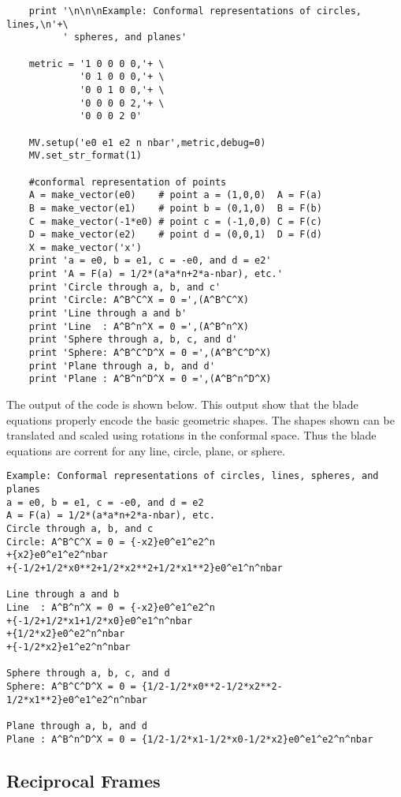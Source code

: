 \documentclass{article}
\begin{document}
\begin{verbatim}
    print '\n\n\nExample: Conformal representations of circles, lines,\n'+\
          ' spheres, and planes'

    metric = '1 0 0 0 0,'+ \
             '0 1 0 0 0,'+ \
             '0 0 1 0 0,'+ \
             '0 0 0 0 2,'+ \
             '0 0 0 2 0'

    MV.setup('e0 e1 e2 n nbar',metric,debug=0)
    MV.set_str_format(1)

    #conformal representation of points
    A = make_vector(e0)    # point a = (1,0,0)  A = F(a)
    B = make_vector(e1)    # point b = (0,1,0)  B = F(b)
    C = make_vector(-1*e0) # point c = (-1,0,0) C = F(c)
    D = make_vector(e2)    # point d = (0,0,1)  D = F(d)
    X = make_vector('x')
    print 'a = e0, b = e1, c = -e0, and d = e2'
    print 'A = F(a) = 1/2*(a*a*n+2*a-nbar), etc.'
    print 'Circle through a, b, and c'
    print 'Circle: A^B^C^X = 0 =',(A^B^C^X)
    print 'Line through a and b'
    print 'Line  : A^B^n^X = 0 =',(A^B^n^X)
    print 'Sphere through a, b, c, and d'
    print 'Sphere: A^B^C^D^X = 0 =',(A^B^C^D^X)
    print 'Plane through a, b, and d'
    print 'Plane : A^B^n^D^X = 0 =',(A^B^n^D^X)
\end{verbatim}

The output of the code is shown below.  This output show that the blade
equations properly encode the basic geometric shapes.  The shapes shown
can be translated and scaled using rotations in the conformal space. Thus
the blade equations are corrent for any line, circle, plane, or sphere. 

\begin{verbatim}
Example: Conformal representations of circles, lines, spheres, and planes
a = e0, b = e1, c = -e0, and d = e2
A = F(a) = 1/2*(a*a*n+2*a-nbar), etc.
Circle through a, b, and c
Circle: A^B^C^X = 0 = {-x2}e0^e1^e2^n
+{x2}e0^e1^e2^nbar
+{-1/2+1/2*x0**2+1/2*x2**2+1/2*x1**2}e0^e1^n^nbar

Line through a and b
Line  : A^B^n^X = 0 = {-x2}e0^e1^e2^n
+{-1/2+1/2*x1+1/2*x0}e0^e1^n^nbar
+{1/2*x2}e0^e2^n^nbar
+{-1/2*x2}e1^e2^n^nbar

Sphere through a, b, c, and d
Sphere: A^B^C^D^X = 0 = {1/2-1/2*x0**2-1/2*x2**2-1/2*x1**2}e0^e1^e2^n^nbar

Plane through a, b, and d
Plane : A^B^n^D^X = 0 = {1/2-1/2*x1-1/2*x0-1/2*x2}e0^e1^e2^n^nbar
\end{verbatim}

\subsection{Reciprocal Frames}
\end{document}
